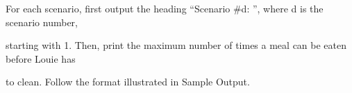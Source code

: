 For each scenario, first output the heading “Scenario \#d: ”, where d is the scenario number, 

starting with 1. Then, print the maximum number of times a meal can be eaten before Louie has 

to clean. Follow the format illustrated in Sample Output.